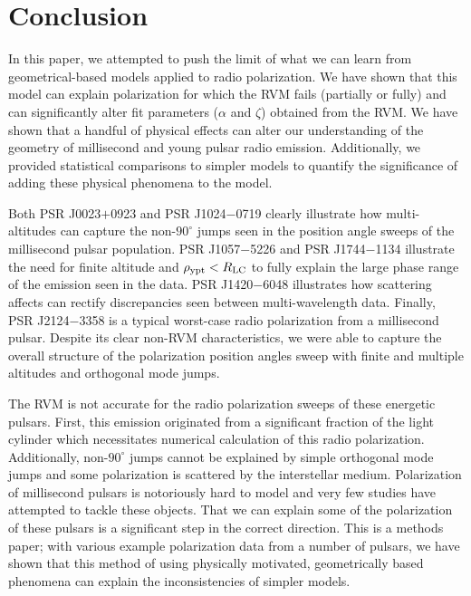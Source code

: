 \section{Conclusion}
\label{sec:conclusion}
In this paper, we attempted to push the limit of what we can 
learn from geometrical-based models applied to radio polarization.
We have shown that this model can explain polarization for 
which the RVM fails (partially or fully) and can significantly alter 
fit parameters ($\alpha$ and $\zeta$) obtained from the RVM.
We have shown that a handful of physical 
effects can alter our understanding of the geometry 
of millisecond and young pulsar radio emission.  
Additionally, we provided statistical comparisons to simpler 
models to quantify the significance of adding 
these physical phenomena to the model.

Both PSR J0023$+$0923 and PSR J1024$-$0719 clearly illustrate
how multi-altitudes can capture the non-$90^\circ$ jumps seen in the
position angle sweeps of the millisecond pulsar population.
PSR J1057$-$5226 and PSR J1744$-$1134 illustrate the need 
for finite altitude and $\rho_{\rm{ypt}}<R_{\rm{LC}}$
to fully explain the large phase range of the emission seen in the data.
PSR J1420$-$6048 illustrates how scattering affects can rectify
discrepancies seen between multi-wavelength data.
Finally, PSR J2124$-$3358 is a typical worst-case radio polarization from a millisecond pulsar.
Despite its clear non-RVM characteristics, we were
able to capture the overall structure of the polarization position angles sweep
with finite and multiple altitudes and orthogonal mode jumps.

The RVM is not accurate for the radio
polarization sweeps of these energetic pulsars.  First, this emission
originated from a significant fraction of the light cylinder which necessitates
numerical calculation of this radio polarization.  Additionally, non-$90^\circ$
jumps cannot be explained by simple orthogonal mode jumps and some polarization 
is scattered by the interstellar medium.
Polarization of millisecond pulsars is notoriously hard to model
and very few studies have attempted to tackle these objects.
That we can explain some of the polarization of these pulsars
is a significant step in the correct direction. 
This is a methods paper; with various example 
polarization data from a number of pulsars, we have shown that this 
method of using physically motivated, geometrically based 
phenomena can explain the inconsistencies of simpler models.  



